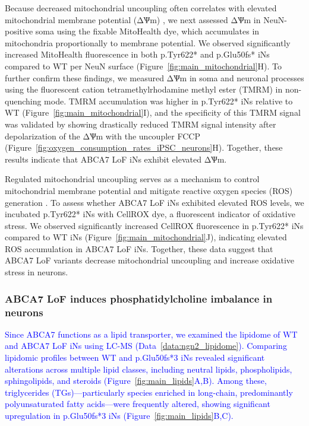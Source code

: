 Because decreased mitochondrial uncoupling often correlates with elevated mitochondrial membrane potential (ΔѰm) \cite{Demine2019-yq,Zorov2021-sj}, we next assessed ΔѰm in NeuN-positive soma using the fixable MitoHealth dye, which accumulates in mitochondria proportionally to membrane potential. We observed significantly increased MitoHealth fluorescence in both p.Tyr622* and p.Glu50fs* iNs compared to WT per NeuN surface (Figure~\ref{fig:main_mitochondrial}H). To further confirm these findings, we measured ΔѰm in soma and neuronal processes using the fluorescent cation tetramethylrhodamine methyl ester (TMRM) in non-quenching mode. TMRM accumulation was higher in p.Tyr622* iNs relative to WT (Figure~\ref{fig:main_mitochondrial}I), and the specificity of this TMRM signal was validated by showing drastically reduced TMRM signal intensity after depolarization of the ΔѰm with the uncoupler FCCP (Figure~\ref{fig:oxygen_consumption_rates_iPSC_neurons}H). Together, these results indicate that ABCA7 LoF iNs exhibit elevated ΔѰm.

Regulated mitochondrial uncoupling serves as a mechanism to control mitochondrial membrane potential and mitigate reactive oxygen species (ROS) generation \cite{Monteiro2021-ei,Demine2019-yq}. To assess whether ABCA7 LoF iNs exhibited elevated ROS levels, we incubated p.Tyr622* iNs with CellROX dye, a fluorescent indicator of oxidative stress. We observed significantly increased CellROX fluorescence in p.Tyr622* iNs compared to WT iNs (Figure~\ref{fig:main_mitochondrial}J), indicating elevated ROS accumulation in ABCA7 LoF iNs. Together, these data suggest that ABCA7 LoF variants decrease mitochondrial uncoupling and increase oxidative stress in neurons.

\subsubsection{ABCA7 LoF induces phosphatidylcholine imbalance in neurons}
\newcommand{\quoteA}{\textcolor{blue}{Since ABCA7 functions as a lipid transporter, we examined the lipidome of WT and ABCA7 LoF iNs using LC-MS (Data~\ref{data:ngn2_lipidome}). Comparing lipidomic profiles between WT and p.Glu50fs*3 iNs revealed significant alterations across multiple lipid classes, including neutral lipids, phospholipids, sphingolipids, and steroids (Figure~\ref{fig:main_lipids}A,B). Among these, triglycerides (TGs)—particularly species enriched in long-chain, predominantly polyunsaturated fatty acids—were frequently altered, showing significant upregulation in p.Glu50fs*3 iNs (Figure~\ref{fig:main_lipids}B,C).\label{quoteA-label}}}
\quoteA

